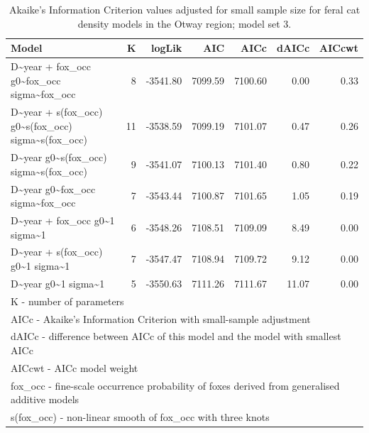\documentclass[]{elsarticle} %
\begin{document}
\begin{longtable}[t]{lrrrrrr}
\caption{\label{tab:density-aic-o-3}Akaike's Information Criterion values adjusted for small sample size for feral cat density models in the Otway region; model set 3.}\\
\toprule
Model & K & logLik & AIC & AICc & dAICc & AICcwt\\
\midrule
D\textasciitilde{}year + fox\_occ g0\textasciitilde{}fox\_occ sigma\textasciitilde{}fox\_occ & 8 & -3541.80 & 7099.59 & 7100.60 & 0.00 & 0.33\\
D\textasciitilde{}year + s(fox\_occ) g0\textasciitilde{}s(fox\_occ) sigma\textasciitilde{}s(fox\_occ) & 11 & -3538.59 & 7099.19 & 7101.07 & 0.47 & 0.26\\
D\textasciitilde{}year g0\textasciitilde{}s(fox\_occ) sigma\textasciitilde{}s(fox\_occ) & 9 & -3541.07 & 7100.13 & 7101.40 & 0.80 & 0.22\\
D\textasciitilde{}year g0\textasciitilde{}fox\_occ sigma\textasciitilde{}fox\_occ & 7 & -3543.44 & 7100.87 & 7101.65 & 1.05 & 0.19\\
D\textasciitilde{}year + fox\_occ g0\textasciitilde{}1 sigma\textasciitilde{}1 & 6 & -3548.26 & 7108.51 & 7109.09 & 8.49 & 0.00\\
\addlinespace
D\textasciitilde{}year + s(fox\_occ) g0\textasciitilde{}1 sigma\textasciitilde{}1 & 7 & -3547.47 & 7108.94 & 7109.72 & 9.12 & 0.00\\
D\textasciitilde{}year g0\textasciitilde{}1 sigma\textasciitilde{}1 & 5 & -3550.63 & 7111.26 & 7111.67 & 11.07 & 0.00\\
\bottomrule
\multicolumn{7}{l}{\rule{0pt}{1em}K - number of parameters}\\
\multicolumn{7}{l}{\rule{0pt}{1em}AICc - Akaike's Information Criterion with small-sample adjustment}\\
\multicolumn{7}{l}{\rule{0pt}{1em}dAICc - difference between AICc of this model and the model with smallest AICc}\\
\multicolumn{7}{l}{\rule{0pt}{1em}AICcwt - AICc model weight}\\
\multicolumn{7}{l}{\rule{0pt}{1em}fox\_occ - fine-scale occurrence probability of foxes derived from generalised additive models}\\
\multicolumn{7}{l}{\rule{0pt}{1em}s(fox\_occ) - non-linear smooth of fox\_occ with three knots}\\
\end{longtable}
\endgroup{}

\newpage
\end{document}
